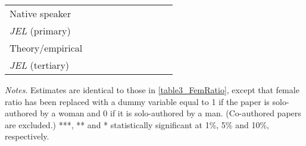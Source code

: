 \begin{table}[H]
\begin{threeparttable}
\begin{tabular}{p{2cm}S@{}S@{}S@{}S@{}S@{}S@{}S@{}S@{}S@{}}
            Native speaker                &               &               &               &               &           {}   &           {}   &           {}   &           {}   &           {}   \\
            \textit{JEL} (primary)        &               &               &               &               &               &               &           {}   &               &               \\
            Theory/empirical              &               &               &               &               &               &               &               &           {}   &               \\
            \textit{JEL} (tertiary)       &               &               &               &               &               &               &               &               &           {}   \\
            \bottomrule
        \end{tabular}
        \begin{tablenotes}
            \tiny
            \item \textit{Notes}. Estimates are identical to those in \autoref{table3_FemRatio}, except that female ratio has been replaced with a dummy variable equal to 1 if the paper is solo-authored by a woman and 0 if it is solo-authored by a man. (Co-authored papers are excluded.) ***, ** and * statistically significant at 1\%, 5\% and 10\%, respectively.
        \end{tablenotes}
    \end{threeparttable}
\end{table}